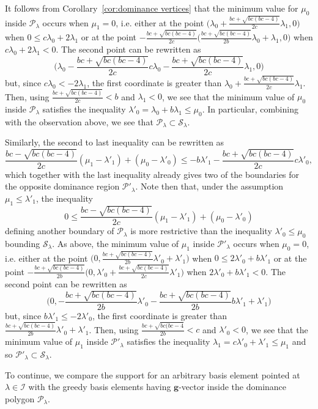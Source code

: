 \documentclass[pdflatex,sn-mathphys]{sn-jnl}%
\theoremstyle{thmstyleone}%
\theoremstyle{thmstyletwo}%
\theoremstyle{thmstylethree}%
\newcommand{\bfg}{\boldsymbol{g}}
\newcommand{\cI}{\mathcal{I}}
\newcommand{\cP}{\mathcal{P}}
\newcommand{\cS}{\mathcal{S}}
\begin{document}
  It follows from Corollary~\ref{cor:dominance vertices} that the minimum value for $\mu_0$ inside $\cP_\lambda$ occurs when $\mu_1=0$, i.e. either at the point $\big( \lambda_0+\frac{bc+\sqrt{bc(bc-4)}}{2c}\lambda_1 , 0 \big)$ when $0 \leq c\lambda_0+2\lambda_1$ or at the point $-\frac{bc+\sqrt{bc(bc-4)}}{2c} \big( \frac{bc+\sqrt{bc(bc-4)}}{2b}\lambda_0+\lambda_1 , 0 \big)$ when $c\lambda_0+2\lambda_1<0$.
  The second point can be rewritten as
  \[\big(\lambda_0 -\frac{bc+\sqrt{bc(bc-4)}}{2c} c\lambda_0-\frac{bc+\sqrt{bc(bc-4)}}{2c} \lambda_1 , 0 \big)\]
  but, since $c\lambda_0 < -2\lambda_1$, the first coordinate is greater than $\lambda_0+\frac{bc+\sqrt{bc(bc-4)}}{2c}\lambda_1$.
  Then, using $\frac{bc+\sqrt{bc(bc-4)}}{2c}<b$ and $\lambda_1<0$, we see that the minimum value of $\mu_0$ inside $\cP_\lambda$ satisfies the inequality $\lambda'_0=\lambda_0+b\lambda_1 \leq \mu_0$.
  In particular, combining with the observation above, we see that $\cP_\lambda\subset\cS_\lambda$.

  Similarly, the second to last inequality can be rewritten as
  \[ \frac{b c-\sqrt{b c (b c-4)}}{2 c}(\mu_1-\lambda'_1)+(\mu_0-\lambda'_0) \leq -b\lambda'_1-\frac{b c+\sqrt{b c (b c-4)}}{2c}c\lambda'_0,\]
  which together with the last inequality already gives two of the boundaries for the opposite dominance region $\cP'_\lambda$.
  Note then that, under the assumption $\mu_1\leq\lambda'_1$, the inequality
  \[ 0 \leq \frac{b c-\sqrt{b c (b c-4)}}{2 c}(\mu_1-\lambda'_1)+(\mu_0-\lambda'_0) \]
  defining another boundary of $\cP_\lambda$ is more restrictive than the inequality $\lambda'_0\leq\mu_0$ bounding $\cS_\lambda$.
  As above, the minimum value of $\mu_1$ inside $\cP'_\lambda$ occurs when $\mu_0=0$, i.e. either at the point $\big(0, \frac{bc+\sqrt{bc(bc-4)}}{2b}\lambda'_0+\lambda'_1 \big)$
  when $0 \leq 2\lambda'_0+b\lambda'_1$ or at the point $-\frac{bc+\sqrt{bc(bc-4)}}{2b} \big(0, \lambda'_0+\frac{bc+\sqrt{bc(bc-4)}}{2c}\lambda'_1 \big)$
  when $2\lambda'_0+b\lambda'_1<0$.
  The second point can be rewritten as
  \[\big(0, -\frac{bc+\sqrt{bc(bc-4)}}{2b} \lambda'_0-\frac{bc+\sqrt{bc(bc-4)}}{2b} b\lambda'_1+\lambda'_1 \big)\]
  but, since $b\lambda'_1\le -2\lambda'_0$, the first coordinate is greater than $\frac{bc+\sqrt{bc(bc-4)}}{2b}\lambda'_0+\lambda'_1$.
  Then, using $\frac{bc+\sqrt{bc(bc-4}}{2b}<c$ and $\lambda'_0<0$, we see that the minimum value of $\mu_1$ inside $\cP'_\lambda$ satisfies the inequality $\lambda_1=c\lambda'_0+\lambda'_1\le\mu_1$ and so $\cP'_\lambda\subset\cS_\lambda$.

  To continue, we compare the support for an arbitrary basis element pointed at $\lambda\in\cI$ with the greedy basis elements having $\bfg$-vector inside the dominance polygon $\cP_\lambda$.
\end{document}
